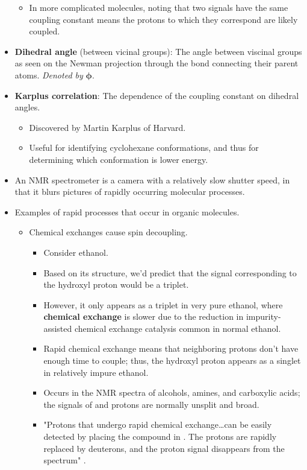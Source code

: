 \documentclass[../notes.tex]{subfiles}
\begin{document}
\begin{itemize}
\begin{itemize}
        \item In more complicated molecules, noting that two signals have the same coupling constant means the protons to which they correspond are likely coupled.
    \end{itemize}
    \item \textbf{Dihedral angle} (between vicinal groups): The angle between viscinal groups as seen on the Newman projection through the bond connecting their parent atoms. \emph{Denoted by} $\bm{\phi}$.
    \item \textbf{Karplus correlation}: The dependence of the coupling constant on dihedral angles.
    \begin{itemize}
        \item Discovered by Martin Karplus of Harvard.
        \item Useful for identifying cyclohexane conformations, and thus for determining which conformation is lower energy.
    \end{itemize}
    \item An NMR spectrometer is a camera with a relatively slow shutter speed, in that it blurs pictures of rapidly occurring molecular processes.
    \item Examples of rapid processes that occur in organic molecules.
    \begin{itemize}
        \item Chemical exchanges cause spin decoupling.
        \begin{itemize}
            \item Consider ethanol.
            \item Based on its structure, we'd predict that the signal corresponding to the hydroxyl proton would be a triplet.
            \item However, it only appears as a triplet in very pure ethanol, where \textbf{chemical exchange} is slower due to the reduction in impurity-assisted chemical exchange catalysis common in normal ethanol.
            \item Rapid chemical exchange means that neighboring protons don't have enough time to couple; thus, the hydroxyl proton appears as a singlet in relatively impure ethanol.
            \item Occurs in the  NMR spectra of alcohols, amines, and carboxylic acids; the signals of  and  protons are normally unsplit and broad.
            \item "Protons that undergo rapid chemical exchange\dots can be easily detected by placing the compound in . The protons are rapidly replaced by deuterons, and the proton signal disappears from the spectrum" \parencite[413]{bib:SolomonsEtAl}.

\end{itemize}
\end{itemize}
\end{itemize}
\end{document}
